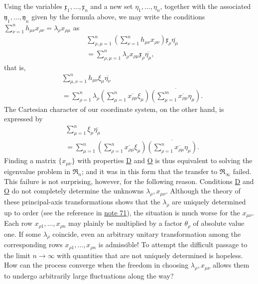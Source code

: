 \documentclass[fontsize=13pt,twoside,openany,headings=normal,parskip=false,bookmarkpackage=false,DIV=calc]{scrbook}
\begin{document}
\hypertarget{origpage-57}{}%
Using the variables $\mathfrak{x}_1,\ldots,\mathfrak{x}_n$ and a new set $\eta_1,\ldots,\eta_n$, together with the associated $\mathfrak{y}_1,\ldots,\mathfrak{y}_n$ given by the formula above, we may write the conditions $\sum_{\nu=1}^n h_{\mu\nu}x_{\rho\nu}=\lambda_\rho x_{\rho\mu}$ as
\begin{align*}
&\sum_{\rho,\mu=1}^n\left(\sum_{\nu=1}^n h_{\mu\nu}x_{\rho\nu}\right)\mathfrak{x}_\rho\overline{\eta_\mu}\\
&=\sum_{\rho,\mu=1}^n\lambda_\rho x_{\rho\mu}\mathfrak{x}_\rho\overline{\eta_\mu},
\end{align*}
that is,
\begin{equation}
\begin{aligned}
&\sum_{\mu,\nu=1}^n h_{\mu\nu}\xi_\mu\overline{\eta_\nu}\\
&=\sum_{\rho=1}^n\lambda_\rho
\left(\sum_{\mu=1}^n\overline{x_{\rho\mu}}\xi_\mu\right)
\overline{\left(\sum_{\mu=1}^m\overline{x_{\rho\mu}}\eta_\mu\right)}.
\end{aligned}
\tag{D}\label{eq:II.7.D}
\end{equation}
The Cartesian character of our coordinate system, on the other hand, is expressed by
\begin{equation}
\begin{aligned}
&\sum_{\mu=1}^n\xi_\mu\overline{\eta_\mu}\\
&=\sum_{\mu=1}^n
\left(\sum_{\rho=1}^n\overline{x_{\rho\mu}}\xi_\mu\right)
\overline{\left(\sum_{\rho=1}^n\overline{x_{\rho\mu}}\eta_\mu\right)}.
\end{aligned}
\tag{O}\label{eq:II.7.O}
\end{equation}
Finding a matrix $\{x_{\mu\nu}\}$ with properties \hyperref[eq:II.7.D]{D} and \hyperref[eq:II.7.O]{O} is thus equivalent to solving the eigenvalue problem in $\mathfrak{R}_n$; and it was in this form that the transfer to $\mathfrak{R}_\infty$ failed. This failure is not surprising, however, for the following reason. Conditions \hyperref[eq:II.7.D]{D} and \hyperref[eq:II.7.O]{O} do not completely determine the unknowns $\lambda_\rho,x_{\mu\nu}$. Although the theory of these principal-axis transformations shows that the $\lambda_\rho$ are uniquely determined up to order (see the reference in \hyperlink{note-71}{note 71}), the situation is much worse for the $x_{\mu\nu}$. Each row $x_{\rho1},\ldots,x_{\rho n}$ may plainly be multiplied by a factor $\theta_\rho$ of absolute value one. If some $\lambda_\rho$ coincide, even an arbitrary unitary transformation among the corresponding rows $x_{\rho1},\ldots,x_{\rho n}$ is admissible! To attempt the difficult passage to the limit $n\to\infty$ with quantities that are not uniquely determined is hopeless. How can the process converge when the freedom in choosing $\lambda_\rho,x_{\mu\nu}$ allows them to undergo arbitrarily large fluctuations along the way?
\end{document}

